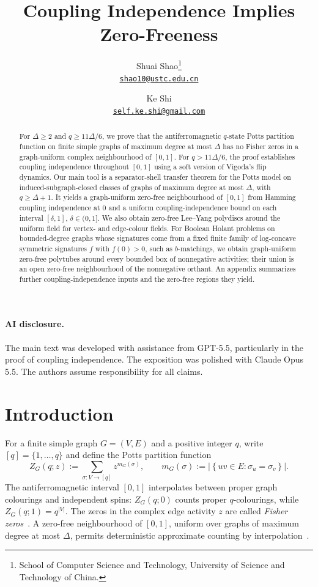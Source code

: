 \documentclass[11pt,reqno]{article}
\title{\bfseries Coupling Independence Implies Zero-Freeness}
\author{Shuai Shao\thanks{School of Computer Science and Technology,
    University of Science and Technology of China.}\\
  \href{mailto:shao10@ustc.edu.cn}{\texttt{shao10@ustc.edu.cn}}
\and
Ke Shi\footnotemark[1]\\
\href{mailto:self.ke.shi@gmail.com}{\texttt{self.ke.shi@gmail.com}}}
\date{}
\theoremstyle{plain}
\theoremstyle{definition}
\theoremstyle{remark}
\theoremstyle{definition}
\theoremstyle{remark}
\newcommand{\abs}[1]{\left|#1\right|}
\newcommand{\set}[1]{\left\{#1\right\}}
\newcommand{\Deg}{\Delta}                        %
\newcommand{\Zpart}{Z}                           %
\newcommand{\colours}{[q]}                        %
\begin{document}
\maketitle

\begin{abstract}
For \(\Delta\ge2\) and \(q\ge11\Delta/6\), we prove that the antiferromagnetic
\(q\)-state Potts partition function on finite simple graphs of maximum
degree at most \(\Delta\) has no Fisher zeros in a graph-uniform complex
neighbourhood of \([0,1]\).  For \(q>11\Delta/6\), the proof establishes
coupling independence throughout \([0,1]\) using a soft version
of Vigoda's flip dynamics.  Our main tool is a separator-shell transfer
theorem for the Potts model on induced-subgraph-closed classes of graphs
of maximum degree at most \(\Delta\), with \(q\ge\Delta+1\).  It yields a
graph-uniform zero-free neighbourhood of \([0,1]\) from Hamming coupling
independence at \(0\) and a uniform coupling-independence bound on each
interval \([\delta,1]\), \(\delta\in(0,1]\).  We also obtain zero-free Lee--Yang
polydiscs around the uniform field for vertex- and edge-colour fields.
For Boolean Holant problems on bounded-degree graphs whose signatures
come from a fixed finite family of log-concave symmetric signatures \(f\)
with \(f(0)>0\), such as \(b\)-matchings, we obtain graph-uniform zero-free
polytubes around every bounded box of nonnegative activities; their
union is an open zero-free neighbourhood of the nonnegative orthant.
An appendix summarizes further coupling-independence
inputs and the zero-free regions they yield.
\end{abstract}

\paragraph*{AI disclosure.}
The main text was developed with assistance from GPT-5.5, particularly
in the proof of coupling independence.  The exposition was polished
with Claude Opus 5.5.  The authors assume responsibility for all claims.

\setcounter{tocdepth}{2}
\tableofcontents


%
%
\section{Introduction}
\label{sec:intro}

For a finite simple graph \(G=(V,E)\) and a positive integer \(q\), write
\(\colours=\{1,\ldots,q\}\) and define the Potts partition function
\begin{equation}
  \Zpart_G(q;z):=\sum_{\sigma\colon V\to\colours}z^{m_G(\sigma)},
  \qquad
  m_G(\sigma):=\abs{\set{uv\in E:\sigma_u=\sigma_v}}.
  \label{eq:intro-potts-Z}
\end{equation}
The antiferromagnetic interval \([0,1]\) interpolates between proper
graph colourings and independent spins: \(\Zpart_G(q;0)\) counts proper
\(q\)-colourings, while \(\Zpart_G(q;1)=q^{|V|}\).
The zeros in the complex edge activity \(z\) are called \emph{Fisher
zeros}~\cite{Fisher1965}.
A zero-free neighbourhood of \([0,1]\), uniform over graphs of maximum
degree at most \(\Deg\), permits deterministic approximate counting by
interpolation~\cite{Barvinok2016,PatelRegts2017}.
\end{document}
